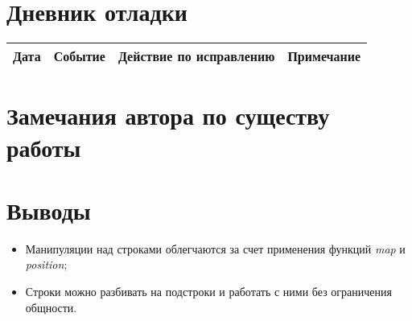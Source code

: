 \documentclass[12pt]{article}
\begin{document}
\section{Дневник отладки}
\begin{tabular}{|c|c|c|c|}
\hline
Дата & Событие & Действие по исправлению & Примечание \\
\hline
\end{tabular}

\section{Замечания автора по существу работы}

\section{Выводы}

\begin{itemize}
    \item Манипуляции над строками облегчаются за счет применения
    функций \textit{map} и \textit{position};
    \item Строки можно разбивать на подстроки и работать с ними
    без ограничения общности.
\end{itemize}
\end{document}
